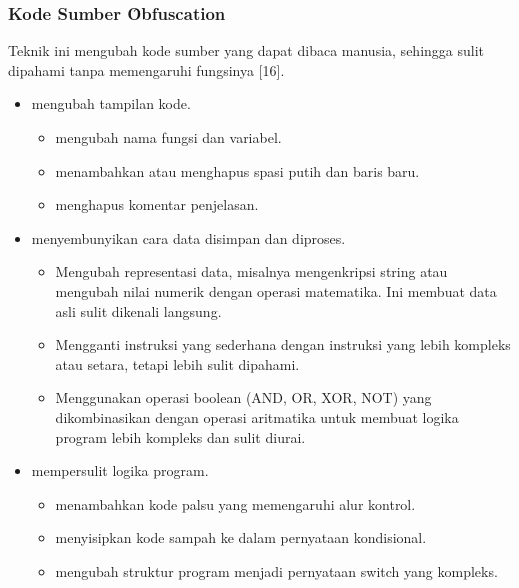 \subsubsection{Kode Sumber \f{Obfuscation}}
Teknik ini mengubah kode sumber yang dapat dibaca manusia, sehingga sulit dipahami tanpa memengaruhi fungsinya [16].
\begin{itemize}
	\item {} mengubah tampilan kode.
	      \begin{itemize}
		      \item {} mengubah nama fungsi dan variabel.
		      \item {} menambahkan atau menghapus spasi putih dan baris baru.
		      \item {} menghapus komentar penjelasan.
	      \end{itemize}
	\item {} menyembunyikan cara data disimpan dan diproses.
	      \begin{itemize}
		      \item {} Mengubah representasi data, misalnya mengenkripsi string atau mengubah nilai numerik dengan operasi matematika. Ini membuat data asli sulit dikenali langsung.
		      \item {} Mengganti instruksi yang sederhana dengan instruksi yang lebih kompleks atau setara, tetapi lebih sulit dipahami.
		      \item {} Menggunakan operasi boolean (AND, OR, XOR, NOT) yang dikombinasikan dengan operasi aritmatika untuk membuat logika program lebih kompleks dan sulit diurai.
	      \end{itemize}
	\item {} mempersulit logika program.
	      \begin{itemize}
		      \item {} menambahkan kode palsu yang memengaruhi alur kontrol.
		      \item {} menyisipkan kode sampah ke dalam pernyataan kondisional.
		      \item {} mengubah struktur program menjadi pernyataan switch yang kompleks.
	      \end{itemize}
\end{itemize}

